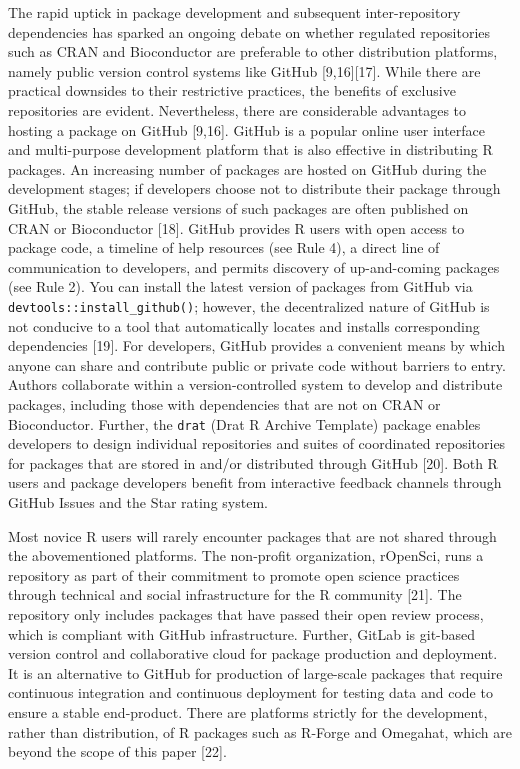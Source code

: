\documentclass[10pt,letterpaper]{article}
\begin{document}
The rapid uptick in package development and subsequent inter-repository
dependencies has sparked an ongoing debate on whether regulated
repositories such as CRAN and Bioconductor are preferable to other
distribution platforms, namely public version control systems like
GitHub {[}9,16{]}{[}17{]}. While there are practical downsides to their
restrictive practices, the benefits of exclusive repositories are
evident. Nevertheless, there are considerable advantages to hosting a
package on GitHub {[}9,16{]}. GitHub is a popular online user interface
and multi-purpose development platform that is also effective in
distributing R packages. An increasing number of packages are hosted on
GitHub during the development stages; if developers choose not to
distribute their package through GitHub, the stable release versions of
such packages are often published on CRAN or Bioconductor {[}18{]}.
GitHub provides R users with open access to package code, a timeline of
help resources (see Rule 4), a direct line of communication to
developers, and permits discovery of up-and-coming packages (see Rule
2). You can install the latest version of packages from GitHub via
\texttt{devtools::install\_github()}; however, the decentralized nature
of GitHub is not conducive to a tool that automatically locates and
installs corresponding dependencies {[}19{]}. For developers, GitHub
provides a convenient means by which anyone can share and contribute
public or private code without barriers to entry. Authors collaborate
within a version-controlled system to develop and distribute packages,
including those with dependencies that are not on CRAN or Bioconductor.
Further, the \texttt{drat} (Drat R Archive Template) package enables
developers to design individual repositories and suites of coordinated
repositories for packages that are stored in and/or distributed through
GitHub {[}20{]}. Both R users and package developers benefit from
interactive feedback channels through GitHub Issues and the Star rating
system.

Most novice R users will rarely encounter packages that are not shared
through the abovementioned platforms. The non-profit organization,
rOpenSci, runs a repository as part of their commitment to promote open
science practices through technical and social infrastructure for the R
community {[}21{]}. The repository only includes packages that have
passed their open review process, which is compliant with GitHub
infrastructure. Further, GitLab is git-based version control and
collaborative cloud for package production and deployment. It is an
alternative to GitHub for production of large-scale packages that
require continuous integration and continuous deployment for testing
data and code to ensure a stable end-product. There are platforms
strictly for the development, rather than distribution, of R packages
such as R-Forge and Omegahat, which are beyond the scope of this paper
{[}22{]}.
\end{document}
